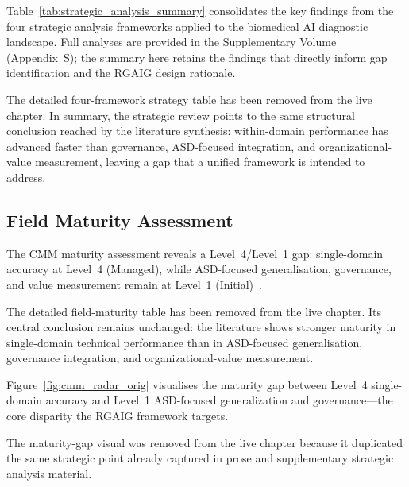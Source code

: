 Table~\ref{tab:strategic_analysis_summary} consolidates the key findings from the four strategic analysis frameworks applied to the biomedical AI diagnostic landscape. Full analyses are provided in the Supplementary Volume (Appendix~S); the summary here retains the findings that directly inform gap identification and the RGAIG design rationale.

The detailed four-framework strategy table has been removed from the live chapter. In summary, the strategic review points to the same structural conclusion reached by the literature synthesis: within-domain performance has advanced faster than governance, ASD-focused integration, and organizational-value measurement, leaving a gap that a unified framework is intended to address.


\subsection{Field Maturity Assessment}

The CMM maturity assessment reveals a Level~4/Level~1 gap: single-domain accuracy at Level~4 (Managed), while ASD-focused generalisation, governance, and value measurement remain at Level~1 (Initial)~\cite{paulk1993cmm}.

The detailed field-maturity table has been removed from the live chapter. Its central conclusion remains unchanged: the literature shows stronger maturity in single-domain technical performance than in ASD-focused generalisation, governance integration, and organizational-value measurement.


Figure~\ref{fig:cmm_radar_orig} visualises the maturity gap between Level~4 single-domain accuracy and Level~1 ASD-focused generalization and governance---the core disparity the RGAIG framework targets.


\noindent The maturity-gap visual was removed from the live chapter because it duplicated the same strategic point already captured in prose and supplementary strategic analysis material.

